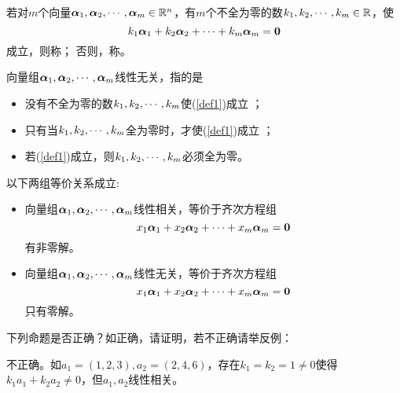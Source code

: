 \begin{frame}
  \begin{dingyi}[线性相关与线性无关]
    若对$m$个向量$\boldsymbol{\alpha}_1,\boldsymbol{\alpha}_2,\cdots,\boldsymbol{\alpha}_m\in \mathbb R^n$，有$m$个不全为零的数$k_1,k_2,\cdots,k_m\in \mathbb R$，使
    \begin{equation}\label{def1}
      k_1\boldsymbol{\alpha}_1 + k_2\boldsymbol{\alpha}_2+\cdots + k_m\boldsymbol{\alpha}_m = \boldsymbol{0}        
    \end{equation}
    成立，则称；
    否则，称。
  \end{dingyi}
\end{frame}

\begin{frame}
  \begin{zhu*}
    向量组$\boldsymbol{\alpha}_1,\boldsymbol{\alpha}_2,\cdots,\boldsymbol{\alpha}_m$线性无关，指的是
    \begin{itemize}
    \item 没有不全为零的数$k_1,k_2,\cdots,k_m$使(\ref{def1})成立 ；\\[0.1in]
    \item 只有当$k_1,k_2,\cdots,k_m$全为零时，才使(\ref{def1})成立 ；\\[0.1in]
    \item 若(\ref{def1})成立，则$k_1,k_2,\cdots,k_m$必须全为零。
    \end{itemize}
  \end{zhu*}
\end{frame}


\begin{frame}
  \begin{dingli}
    以下两组等价关系成立:
    \begin{itemize}
    \item  向量组$\boldsymbol{\alpha}_1,\boldsymbol{\alpha}_2,\cdots,\boldsymbol{\alpha}_m$线性相关，等价于齐次方程组
      $$
      x_1\boldsymbol{\alpha}_1+x_2\boldsymbol{\alpha}_2+\cdots+x_m\boldsymbol{\alpha}_m=\boldsymbol{0}
      $$
      有非零解。
    \item  向量组$\boldsymbol{\alpha}_1,\boldsymbol{\alpha}_2,\cdots,\boldsymbol{\alpha}_m$线性无关，等价于齐次方程组
      $$
      x_1\boldsymbol{\alpha}_1+x_2\boldsymbol{\alpha}_2+\cdots+x_m\boldsymbol{\alpha}_m=\boldsymbol{0}
      $$
      只有零解。
    \end{itemize}
  \end{dingli}
\end{frame}

\begin{frame}
  \begin{li}[$\bigstar$]
    下列命题是否正确？如正确，请证明，若不正确请举反例：
  \end{li}
  \pause
  \begin{jie}
    不正确。如$a_1=(1,2,3), a_2=(2,4,6)$，存在$k_1=k_2=1\ne 0$使得$k_1a_1+k_2a_2\ne0$，但$a_1,a_2$线性相关。
  \end{jie}
\end{frame}


